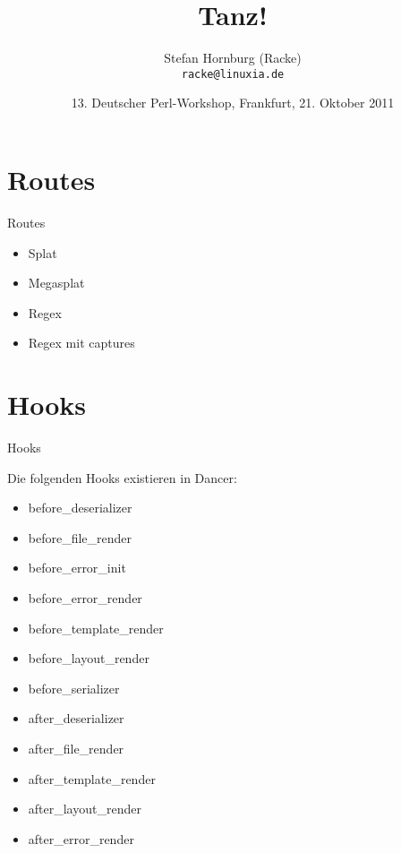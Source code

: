 \usepackage[T1]{fontenc}
\usepackage{mathptmx}
\usepackage[scaled=.90]{helvet}
\usepackage{courier}

\usepackage{beamerthemesplit}
\usepackage{verbatim}
\usepackage{hyperref}
\usepackage{listings}
\lstset{language=Perl,basicstyle=\footnotesize,tabsize=3,showstringspaces=false}

\title{Tanz!}
\author[racke]{Stefan Hornburg (Racke)\\ \texttt{racke@linuxia.de}}
\date[GPW2011]{13. Deutscher Perl-Workshop, Frankfurt, 21. Oktober 2011}



\maketitle{}

\begin{frame}
  \titlepage
\end{frame}

\tableofcontents

\section{Routes}
\begin{frame}{Routes}
\begin{itemize}
\item Splat
\item Megasplat
\item Regex
\item Regex mit captures
\end{itemize}
\end{frame}

\section{Hooks}
\begin{frame}{Hooks}
\end{frame}

Die folgenden Hooks existieren in Dancer:

\begin{itemize}
\item before\_deserializer
\item before\_file\_render
\item before\_error\_init
\item before\_error\_render
\item before\_template\_render
\item before\_layout\_render
\item before\_serializer
\item after\_deserializer
\item after\_file\_render
\item after\_template\_render
\item after\_layout\_render
\item after\_error\_render
\end{itemize}


